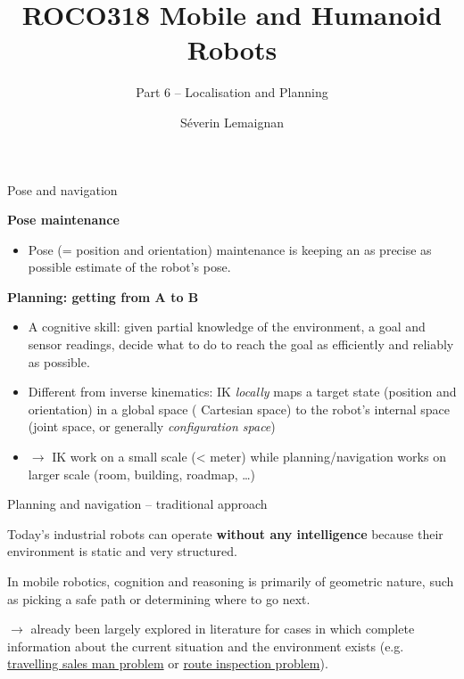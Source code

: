 \documentclass[compress,xcolor=table]{beamer}
\title{ROCO318 \newline Mobile and Humanoid Robots}
\subtitle{Part 6 -- Localisation and Planning}
\date{}
\author{Séverin Lemaignan}
\institute{Centre for Neural Systems and Robotics\\{\bf Plymouth University}}
\begin{document}

\maketitle

\begin{frame}{Pose and navigation}

    \textbf{Pose maintenance}

    \begin{itemize}
        \item Pose (= position and orientation) maintenance is
            keeping an as precise as possible estimate of the robot's pose.
    \end{itemize}

    \pause

    \textbf{Planning: getting from A to B}

    \begin{itemize}
        \item A cognitive skill: given partial knowledge of the environment, a
            goal and sensor readings, decide what to do to reach the goal as
            efficiently and reliably as possible.

        \item Different from inverse kinematics: IK \emph{locally} maps a
            target state (position and orientation) in a global space (\eg
            Cartesian space) to the robot's internal space (joint space, or
            generally \emph{configuration space})

        \item $\rightarrow$ IK work on a small scale (\textless{} meter) while
            planning/navigation works on larger scale (room, building, roadmap,
            \ldots{})

    \end{itemize}

\end{frame}

\begin{frame}{Planning and navigation -- traditional approach}

    Today's industrial robots can operate \textbf{without any intelligence} because
    their environment is static and very structured.

    In mobile robotics, cognition and reasoning is primarily of geometric
    nature, such as picking a safe path or determining where to go next.

    $\rightarrow$ already been largely explored in literature for cases in
    which complete information about the current situation and the environment
    exists (e.g.
    \href{http://en.wikipedia.org/wiki/Travelling_salesman_problem}{travelling
    sales man problem} or
    \href{http://en.wikipedia.org/wiki/Route_inspection_problem}{route
    inspection problem}).

\end{frame}
\end{document}
